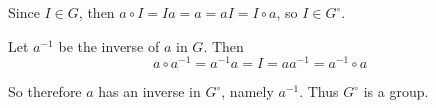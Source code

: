 \begin{itemize}
Since $I \in G$, then $a \circ I = Ia = a = aI = I \circ a$, so $I \in G^\circ$.

Let $a^{-1}$ be the inverse of $a$ in $G$. Then
$$a \circ a^{-1} = a^{-1}a = I = aa^{-1} = a^{-1} \circ a$$

So therefore $a$ has an inverse in $G^\circ$, namely $a^{-1}$. Thus $G^\circ$ is a group.
\end{itemize}
%